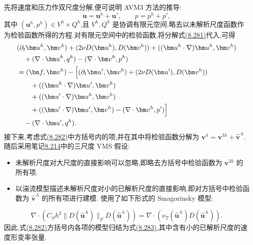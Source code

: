 \begin{note}[AVM3 方法]
\label{note:vms-avm3-method}
先将速度和压力作双尺度分解,便可说明 AVM3 方法的推导:
\begin{equation}\label{eq:vms-avm-two-scale-decomposition}
 \bm u=\bm u^h+\bm u',\qquad p=p^h+p',
\end{equation}
其中 $(\bm u^h,p^h)\in V^h\times Q^h$,且 $V^h,Q^h$ 是协调有限元空间.略去以未解析尺度函数作为检验函数所得的方程.对有限元空间中的检验函数,将分解式\hyperref[eq:vms-avm-two-scale-decomposition]{(8.281)}代入,可得
\begin{equation}\label{eq:vms-avm-unresolved-bracket}
\begin{aligned}
 &(\partial_t\bm u^h,\bm v^h)
 +(2\nu D(\bm u^h),D(\bm v^h))
 +((\bm u^h\cdot\nabla)\bm u^h,\bm v^h)\\
 &\quad+(\nabla\cdot\bm u^h,q^h)
 -(\nabla\cdot\bm v^h,p^h)\\
 &=(\bm f,\bm v^h)-\Bigl[
   (\partial_t\bm u',\bm v^h)
   +(2\nu D(\bm u'),D(\bm v^h))\\
 &\qquad+((\bm u^h\cdot\nabla)\bm u',\bm v^h)\\
 &\qquad+((\bm u'\cdot\nabla)\bm u^h,\bm v^h)\\
 &\qquad+((\bm u'\cdot\nabla)\bm u',\bm v^h)
   -(\nabla\cdot\bm v^h,p')\Bigr]\\
 &\quad-(\nabla\cdot\bm u',q^h).
\end{aligned}
\end{equation}
接下来,考虑式\hyperref[eq:vms-avm-unresolved-bracket]{(8.282)}中方括号内的项,并在其中将检验函数分解为 $\bm v^h=\bm v^{3h}+\widehat{\bm v}^{\,h}$.随后采用笔记\hyperref[note:vms-three-scale-approach]{8.214}中的三尺度 VMS 假设:
\begin{itemize}
 \item 未解析尺度对大尺度的直接影响可以忽略,即略去方括号中检验函数为 $\bm v^{3h}$ 的所有项.
 \item 以湍流模型描述未解析尺度对小的已解析尺度的直接影响,即对方括号中检验函数为 $\widehat{\bm v}^{\,h}$ 的所有项进行建模.\textcite{GravemeierGeeKronbichlerWall2010} 使用了如下形式的 Smagorinsky 模型:
\end{itemize}
\begin{equation}\label{eq:vms-avm3-smagorinsky-model}
 \nabla\cdot\left(C_Sh^2
   \|D(\widehat{\bm u}^{\,h})\|_F
   D(\widehat{\bm u}^{\,h})\right)
 =\nabla\cdot\left(\nu_T(\widehat{\bm u}^{\,h})
   D(\widehat{\bm u}^{\,h})\right).
\end{equation}
因此,式\hyperref[eq:vms-avm-unresolved-bracket]{(8.282)}方括号内各项的模型归结为式\hyperref[eq:vms-avm3-smagorinsky-model]{(8.283)},其中含有小的已解析尺度的速度形变率张量.
\end{note}


